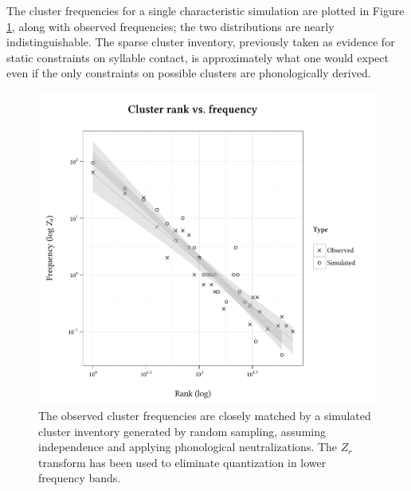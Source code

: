 The cluster frequencies for a single characteristic simulation are plotted in Figure \ref{sim}, along with observed frequencies; the two distributions are nearly indistinguishable. The sparse cluster inventory, previously taken as evidence for static constraints on syllable contact, is approximately what one would expect even if the only constraints on possible clusters are phonologically derived.

\begin{figure}
\centering
\includegraphics{sim.pdf}
\caption{The observed cluster frequencies are closely matched by a simulated cluster inventory generated by random sampling, assuming independence and applying phonological neutralizations. The $Z_r$ transform \citep[][29]{Church1991} has been used to eliminate quantization in lower frequency bands.}
\label{sim}
\end{figure}
